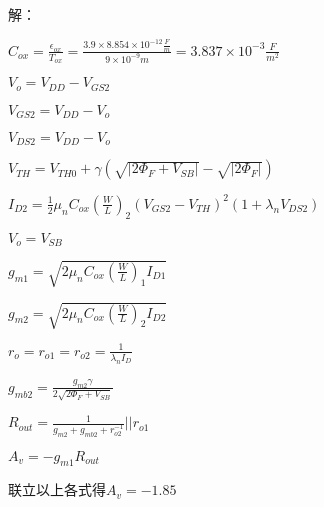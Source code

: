 
\setcounter{tocdepth}{1}                %
\setcounter{secnumdepth}{0}             %

\titleformat{\chapter}{\huge}{}{1em}{}




解：

\scalebox{3}{$M_2$采用有二极管连接的NMOS器件:}


$C_{ox}=\frac{\epsilon_{ox}}{T_{ox}}=\frac{3.9 \times 8.854 \times 10^{-12}\frac{F}{m}}{9 \times 10^{-9}m}=3.837 \times 10^{-3}\frac{F}{m^2}$

$V_o=V_{DD}-V_{GS2}$

$V_{GS2}=V_{DD}-V_o$

$V_{DS2}=V_{DD}-V_o$

$V_{TH}=V_{TH0}+\gamma(\sqrt{|2\Phi_F+V_{SB}|}-\sqrt{|2\Phi_F|})$

$I_{D2}=\frac{1}{2}\mu_nC_{ox}(\frac{W}{L})_2(V_{GS2}-V_{TH})^2(1+\lambda_n V_{DS2})$

$V_o=V_{SB}$

$g_{m1}=\sqrt{2\mu_nC_{ox}(\frac{W}{L})_1I_{D1}}$

$g_{m2}=\sqrt{2\mu_nC_{ox}(\frac{W}{L})_2I_{D2}}$

$r_o=r_{o1}=r_{o2}=\frac{1}{\lambda_n I_D}$

$g_{mb2}=\frac{g_{m2}\gamma}{2\sqrt{2\Phi_F+V_{SB}}}$


$R_{out}=\frac{1}{g_{m2}+g_{mb2}+r_{o2}^{-1}}||r_{o1}$

$A_v=-g_{m1}R_{out}$

联立以上各式得$A_v=-1.85$






